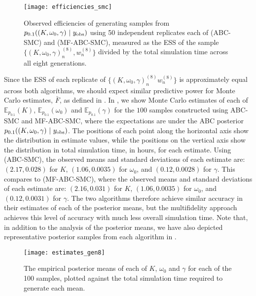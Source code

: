 \documentclass[review]{siamonline190516}
\begin{document}
\begin{figure}
\centering
\texttt{[image: efficiencies\_smc]}
\caption{
Observed efficiencies of generating samples from $p_{0.1}((K, \omega_0, \gamma)~|~y_{\mathrm{obs}})$ using 50 independent replicates each of  (ABC-SMC) and  (MF-ABC-SMC), measured as the ESS of the sample $\{(K, \omega_0, \gamma)_n^{(8)}, w_n^{(8)}\}$ divided by the total simulation time across all eight generations.
}
\label{fig:efficiencies_smc}
\end{figure}

Since the ESS of each replicate of $\{ (K, \omega_0, \gamma)_n^{(8)} w_n^{(8)}  \}$ is approximately equal across both algorithms, we should expect similar predictive power for Monte Carlo estimates, $\bar F$, as defined in .
In , we show Monte Carlo estimates of each of $\mathbb E_{p_{0.1}}(K)$, $\mathbb E_{p_{0.1}}(\omega_0)$ and $\mathbb E_{p_{0.1}}(\gamma)$ for the $100$ samples constructed using ABC-SMC and MF-ABC-SMC, where the expectations are under the ABC posterior $p_{0.1}((K, \omega_0, \gamma)~|~y_{\mathrm{obs}})$.
The positions of each point along the horizontal axis show the distribution in estimate values, while the positions on the vertical axis show the distribution in total simulation time, in hours, for each estimate.
Using  (ABC-SMC), the observed means and standard deviations of each estimate are: 
$(2.17, 0.028)$ for $K$, $(1.06, 0.0035)$ for $\omega_0$, and $(0.12, 0.0028)$ for $\gamma$.
This compares to  (MF-ABC-SMC), where the observed means and standard deviations of each estimate are: 
$(2.16, 0.031)$ for $K$, $(1.06, 0.0035)$ for $\omega_0$, and $(0.12, 0.0031)$ for $\gamma$.
The two algorithms therefore achieve similar accuracy in their estimates of each of the posterior means, but the multifidelity approach achieves this level of accuracy with much less overall simulation time.
Note that, in addition to the analysis of the posterior means, we have also depicted representative posterior samples from each algorithm in .

\begin{figure*}
\centering
\texttt{[image: estimates\_gen8]}
\caption{
The empirical posterior means of each of $K$, $\omega_0$ and $\gamma$ for each of the 100 samples, plotted against the total simulation time required to generate each mean.
}
\label{fig:empirical_means}
\end{figure*}
\end{document}
